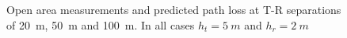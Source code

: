 \documentclass[10pt,journal,twoside]{IEEEtran}
\begin{document}
%
\begin{figure}[!ht]
	\centering
	\hfil
	\hfil
	\caption{Open area measurements and predicted path loss at T-R separations of \protect{} \SI{20}{m}, \protect{} \SI{50}{m} and \protect{} \SI{100}{m}. In all cases $h_t = \SI{5}{m}$ and $h_r = \SI{2}{m}$}
	\label{fig:pl_control}
\end{figure}
%
\end{document}
